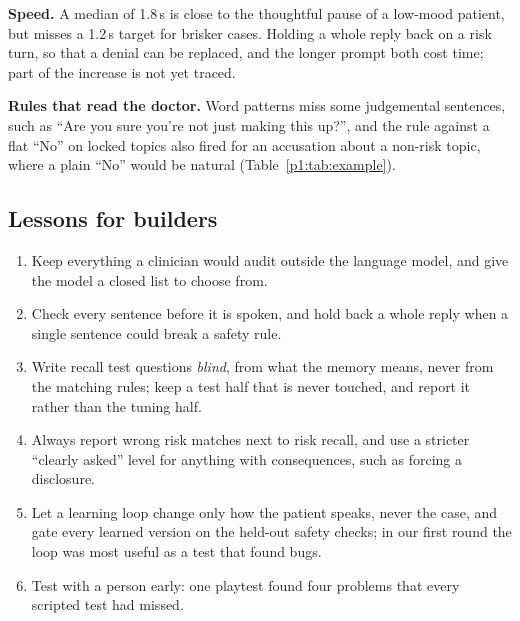 \textbf{Speed.} A median of 1.8\,s is close to the thoughtful pause of a low-mood patient, but misses a 1.2\,s target for brisker cases. Holding
a whole reply back on a risk turn, so that a denial can be replaced, and the longer prompt both cost time; part of the increase is not yet
traced.

\textbf{Rules that read the doctor.} Word patterns miss some judgemental sentences, such as ``Are you sure you're not just making this up?'', and
the rule against a flat ``No'' on locked topics also fired for an accusation about a non-risk topic, where a plain ``No'' would be natural
(Table~\ref{p1:tab:example}).

\subsection{Lessons for builders}
\begin{enumerate}
\item Keep everything a clinician would audit outside the language model, and give the model a closed list to choose from.
\item Check every sentence before it is spoken, and hold back a whole reply when a single sentence could break a safety rule.
\item Write recall test questions \emph{blind}, from what the memory means, never from the matching rules; keep a test half that is never
touched, and report it rather than the tuning half.
\item Always report wrong risk matches next to risk recall, and use a stricter ``clearly asked'' level for anything with consequences, such as
forcing a disclosure.
\item Let a learning loop change only how the patient speaks, never the case, and gate every learned version on the held-out safety checks; in
our first round the loop was most useful as a test that found bugs.
\item Test with a person early: one playtest found four problems that every scripted test had missed.
\end{enumerate}

